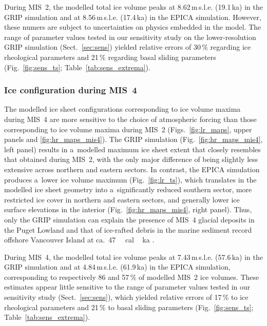 \documentclass[tc, manuscript]{copernicus}
\begin{document}
      During MIS~2, the modelled total ice volume peaks at
      8.62\,\unit{m}\,s.l.e. (19.1\,\unit{ka}) in the GRIP simulation and at
      8.56\,\unit{m}\,s.l.e. (17.4\,\unit{ka}) in the EPICA simulation.
      However, these numers are subject to uncertainties on physics
      embedded in the model. The range of parameter values tested in our
      sensitivity study on the lower-resolution GRIP simulation
      (Sect.~\ref{sec:sens}) yielded relative errors of 30\,\unit{\%}
      regarding ice rheological parameters and 21\,\unit{\%} regarding basal
      sliding parameters (Fig.~\ref{fig:sens_ts};
      Table~\ref{tab:sens_extrema}).


\subsubsection{Ice configuration during MIS~4}
\label{sec:mis4}

      The modelled ice sheet configurations corresponding to ice volume
      maxima during MIS~4 are more sensitive to the choice of atmospheric
      forcing than those corresponding to ice volume maxima during MIS~2
      (Figs.~\ref{fig:lr_maps}, upper panels and \ref{fig:hr_maps_mis4}).
      The GRIP simulation (Fig.~\ref{fig:hr_maps_mis4}, left panel) results
      in a~modelled maximum ice sheet extent that closely resembles that
      obtained during MIS~2, with the only major difference of being
      slightly less extensive across northern and eastern sectors. In
      contrast, the EPICA simulation produces a~lower ice volume maximum
      (Fig.~\ref{fig:lr_ts}), which translates in the modelled ice sheet
      geometry into a~significantly reduced southern sector, more restricted
      ice cover in northern and eastern sectors, and generally lower ice
      surface elevations in the interior (Fig.~\ref{fig:hr_maps_mis4}, right
      panel). Thus, only the GRIP simulation can explain the presence of
      MIS~4 glacial deposits in the Puget Lowland \citep{Troost.2014} and
      that of ice-rafted debris in the marine sediment record offshore
      Vancouver Island at ca.~47\,\unit{\,cal\,ka}
      \citep{Cosma.etal.2008}.

      During MIS~4, the modelled total ice volume peaks at
      7.43\,\unit{m}\,s.l.e. (57.6\,\unit{ka}) in the GRIP simulation and at
      4.84\,\unit{m}\,s.l.e. (61.9\,\unit{ka}) in the EPICA simulation,
      corresponding to respectively 86 and 57\,\unit{\%} of modelled MIS~2
      ice volumes.
      These estimates appear little sensitive to the range of parameter
      values tested in our sensitivity study (Sect.~\ref{sec:sens}), which
      yielded relative errors of 17\,\unit{\%} to ice rheological parameters
      and 21\,\unit{\%} to basal sliding parameters
      (Fig.~\ref{fig:sens_ts}; Table~\ref{tab:sens_extrema}).
\end{document}
